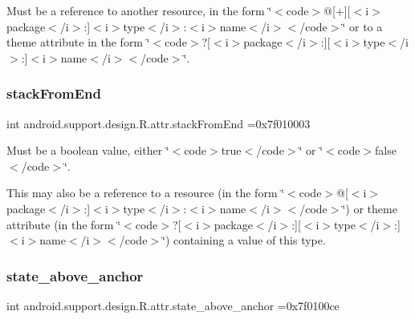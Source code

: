 Must be a reference to another resource, in the form \char`\"{}$<$code$>$@\mbox{[}+\mbox{]}\mbox{[}$<$i$>$package$<$/i$>$\+:\mbox{]}$<$i$>$type$<$/i$>$\+:$<$i$>$name$<$/i$>$$<$/code$>$\char`\"{} or to a theme attribute in the form \char`\"{}$<$code$>$?\mbox{[}$<$i$>$package$<$/i$>$\+:\mbox{]}\mbox{[}$<$i$>$type$<$/i$>$\+:\mbox{]}$<$i$>$name$<$/i$>$$<$/code$>$\char`\"{}. \mbox{\label{classandroid_1_1support_1_1design_1_1R_1_1attr_a1f9238824c3f4302159c28ee264ad333}} 
\subsubsection{\texorpdfstring{stack\+From\+End}{stackFromEnd}}
{\footnotesize\ttfamily int android.\+support.\+design.\+R.\+attr.\+stack\+From\+End =0x7f010003\hspace{0.3cm}{\ttfamily [static]}}

Must be a boolean value, either \char`\"{}$<$code$>$true$<$/code$>$\char`\"{} or \char`\"{}$<$code$>$false$<$/code$>$\char`\"{}. 

This may also be a reference to a resource (in the form \char`\"{}$<$code$>$@\mbox{[}$<$i$>$package$<$/i$>$\+:\mbox{]}$<$i$>$type$<$/i$>$\+:$<$i$>$name$<$/i$>$$<$/code$>$\char`\"{}) or theme attribute (in the form \char`\"{}$<$code$>$?\mbox{[}$<$i$>$package$<$/i$>$\+:\mbox{]}\mbox{[}$<$i$>$type$<$/i$>$\+:\mbox{]}$<$i$>$name$<$/i$>$$<$/code$>$\char`\"{}) containing a value of this type. \mbox{\label{classandroid_1_1support_1_1design_1_1R_1_1attr_a71358048ede13b57275c399f9dc04e71}} 
\subsubsection{\texorpdfstring{state\+\_\+above\+\_\+anchor}{state\_above\_anchor}}
{\footnotesize\ttfamily int android.\+support.\+design.\+R.\+attr.\+state\+\_\+above\+\_\+anchor =0x7f0100ce\hspace{0.3cm}{\ttfamily [static]}}

